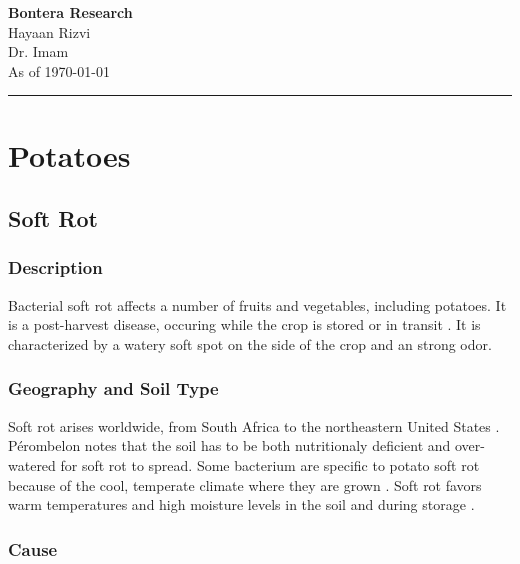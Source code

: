 \documentclass[12pt]{article}
\begin{document}
\begin{center}
	\Huge\textbf{Bontera Research}\\

	\Large{Hayaan Rizvi}\\

	\Large{Dr. Imam}\\
	As of \today\\
	\hfill \break
	\noindent\rule{10cm}{0.4pt}

\end{center}

\setlength{\parindent}{0.5in}

\hfill \break
\newpage

\tableofcontents

\newpage
\section{Potatoes}
\subsection{Soft Rot}
\subsubsection{Description}

Bacterial soft rot affects a number of fruits and vegetables, including potatoes. It is a post-harvest disease, occuring while the crop is stored or in transit \autocite{rich2013potato}. It is characterized by a watery soft spot on the side of the crop and an strong odor.

\subsubsection{Geography and Soil Type}

Soft rot arises worldwide, from South Africa \autocite{ngadze2012pectinolytic} to the northeastern United States \autocite{ge2021genotyping}. Pérombelon notes that the soil has to be both nutritionaly deficient and over-watered for soft rot to spread. Some bacterium are specific to potato soft rot because of the cool, temperate climate where they are grown \autocite{perombelon2002potato}. Soft rot favors warm temperatures and high moisture levels in the soil and during storage \autocite{rich2013potato}.

\subsubsection{Cause}
\end{document}
